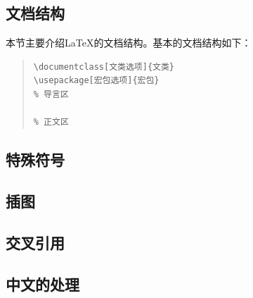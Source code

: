 \subsection{文档结构}
本节主要介绍\LaTeX{}的文档结构。基本的文档结构如下：
\begin{quote}
\begin{verbatim}
\documentclass[文类选项]{文类}
\usepackage[宏包选项]{宏包}
% 导言区

% 正文区

\end{verbatim}
\end{quote}

\subsection{特殊符号}

\subsection{插图}

\subsection{交叉引用}

\subsection{中文的处理} 